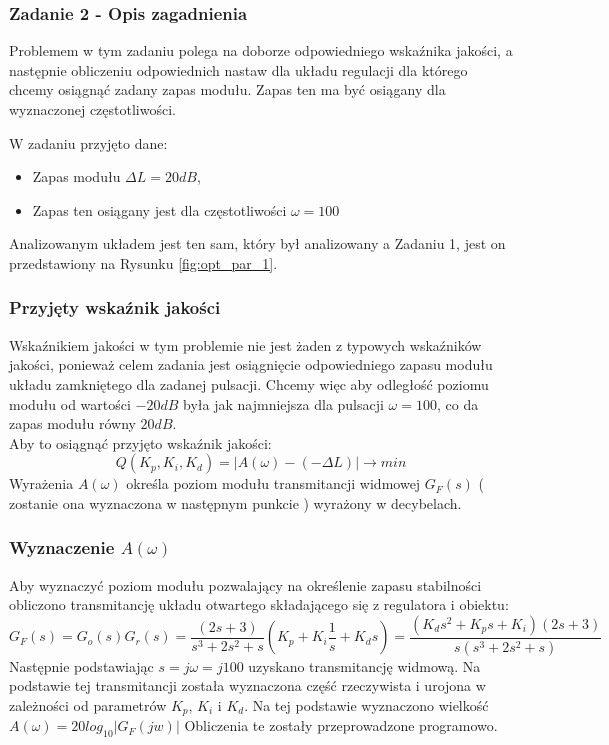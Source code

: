 \documentclass[a4paper,11pt]{article}
\begin{document}
\subsubsection{Zadanie 2 - Opis zagadnienia}
Problemem w tym zadaniu polega na doborze odpowiedniego wskaźnika jakości, a następnie obliczeniu odpowiednich nastaw dla układu regulacji dla którego chcemy osiągnąć zadany zapas modułu. Zapas ten ma być osiągany dla wyznaczonej częstotliwości. 

W zadaniu przyjęto dane:
\begin{itemize}
\item Zapas modułu \( \Delta L = 20 dB \),
\item Zapas ten osiągany jest dla częstotliwości \( \omega = 100 \) 
\end{itemize}

Analizowanym układem jest ten sam, który był analizowany a Zadaniu 1, jest on przedstawiony na Rysunku \ref{fig:opt_par_1}.

\subsubsection{Przyjęty wskaźnik jakości}
Wskaźnikiem jakości w tym problemie nie jest żaden z typowych wskaźników jakości, ponieważ celem zadania jest osiągnięcie odpowiedniego zapasu modułu układu zamkniętego dla zadanej pulsacji. Chcemy więc aby odległość poziomu modułu od wartości \( -20 dB \) była jak najmniejsza dla pulsacji \( \omega = 100 \), co da zapas modułu równy \( 20 dB \). \\
Aby to osiągnąć przyjęto wskaźnik jakości: 
\begin{equation*}
Q(K_{p},K_{i},K_{d})=|A(\omega) - ( - \Delta L ) | \rightarrow min
\end{equation*}
Wyrażenia \( A(\omega) \) określa poziom modułu transmitancji widmowej  \( G_{F}(s) \) ( zostanie ona wyznaczona w następnym punkcie ) wyrażony w decybelach.

\subsubsection{Wyznaczenie \( A(\omega) \)}
Aby wyznaczyć poziom modułu pozwalający na określenie zapasu stabilności obliczono transmitancję układu otwartego składającego się z regulatora i obiektu:
\begin{equation}\label{eq:2}
G_{F}(s) = G_{o}(s)G_{r}(s) = \frac{(2s+3)}{s^{3}+2s^{2}+s}(K_{p}+K_{i}\frac{1}{s}+K_{d}s)=\frac{(K_{d}s^{2}+K_{p}s+K_{i})(2s+3)}{s(s^{3}+2s^{2}+s)}
\end{equation}
Następnie podstawiając \( s = j \omega = j100\) uzyskano transmitancję widmową. Na podstawie tej transmitancji została wyznaczona część rzeczywista i urojona w zależności od parametrów \( K_{p} \), \(K_{i} \) i \( K_{d} \). Na tej podstawie wyznaczono wielkość \( A( \omega) = 20log_{10} |G_{F}(jw)| \)  Obliczenia te zostały przeprowadzone programowo.
\end{document}
